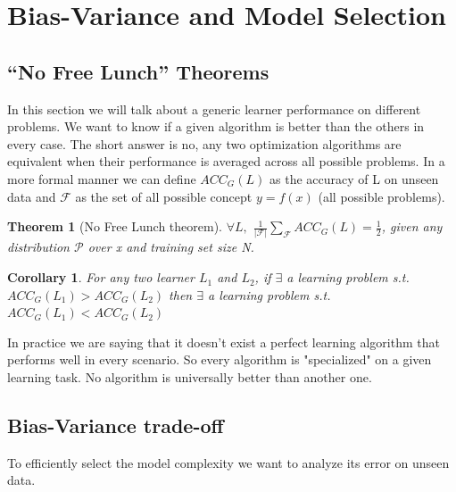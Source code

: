 \documentclass[main.tex]{subfiles}
\newtheorem{theorem}{Theorem}[section] %
\newtheorem{corollary}{Corollary}[theorem]
\begin{document}
\section{Bias-Variance and Model Selection}
\subsection{“No Free Lunch” Theorems}
In this section we will talk about a generic learner performance on different problems. We want to know if a given algorithm is better than the others in every case. The short answer is no, any two optimization algorithms are equivalent when their performance is averaged across all possible problems. In a more formal manner we can define $ACC_G(L)$ as the accuracy of L on unseen data and $\mathcal{F}$ as the set of all possible concept $y=f(x)$ (all possible problems).
\begin{theorem}[No Free Lunch theorem]
    $\forall L,$ $\frac{1}{|\mathcal{F}|} \sum_{\mathcal{F}} ACC_G(L) = \frac{1}{2}$, given any distribution $\mathcal{P}$ over x and training set size N.
\end{theorem}
\begin{corollary}
    For any two learner $L_1$ and $L_2$, if $\exists$ a learning problem s.t. $ACC_G(L_1)>ACC_G(L_2)$ then $\exists$ a learning problem s.t. $ACC_G(L_1)<ACC_G(L_2)$
\end{corollary}
In practice we are saying that it doesn't exist a perfect learning algorithm that performs well in every scenario. So every algorithm is "specialized" on a given learning task. No algorithm is universally better than another one.

\subsection{Bias-Variance trade-off}
To efficiently select the model complexity we want to analyze its error on unseen data.
\end{document}
